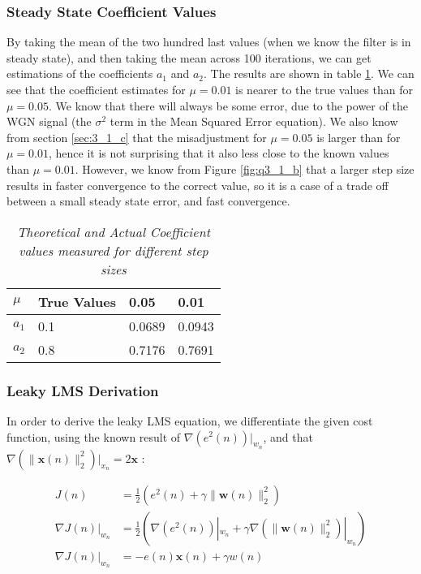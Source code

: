 \documentclass[./main.tex]{subfiles}
\begin{document}
\subsubsection{Steady State Coefficient Values}
By taking the mean of the two hundred last values (when we know the filter is in steady state), and then taking the mean across 100 iterations, we can get estimations of the coefficients $a_1$ and $a_2$. The results are shown in table \ref{tab:3_1_d}. We can see that the coefficient estimates for $\mu = 0.01$ is nearer to the true values than for $\mu = 0.05$. We know that there will always be some error, due to the power of the WGN signal (the $ \sigma^2$ term in the Mean Squared Error equation). We also know from section \ref{sec:3_1_c} that the misadjustment for  $\mu = 0.05$ is larger than for $\mu = 0.01 $, hence it is not surprising that it also less close to the known values than  $\mu = 0.01$. However, we know from Figure \ref{fig:q3_1_b} that a larger step size results in faster convergence to the correct value, so it is a case of a trade off between a small steady state error, and fast convergence.

\begin{table}[h]
\centering
\begin{tabular}{|l|l|l|l|}
\hline
$\mu$ & True Values & 0.05   & 0.01   \\ \hline
$a_1$ & 0.1               & 0.0689 & 0.0943 \\ \hline
$a_2$ & 0.8               & 0.7176 & 0.7691 \\ \hline
\end{tabular}
\caption{\textit{Theoretical and Actual Coefficient values measured for different step sizes}}
\label{tab:3_1_d}
\end{table}

\subsubsection{Leaky LMS Derivation}
In order to derive the leaky LMS equation, we differentiate the given cost function, using the known result of $ \nabla ( e^2(n) ) |_{w_n}$, and that $ \nabla (\lVert \mathbf{x}(n)\rVert_2^2 )|_{x_n} = 2\mathbf{x} $ \cite{Berger2007}  :

\begin{subequations}
\begin{align}
J(n) &= \frac{1}{2} ( e^2(n) + \gamma \lVert \mathbf{w}(n) \rVert_2^2 ) \\
\nabla J(n)|_{w_n} &= \frac{1}{2}  ( \nabla ( e^2(n) ) |_{w_n} + \gamma \nabla (\lVert \mathbf{w}(n)\rVert_2^2 )|_{w_n} ) \\
\nabla J(n)|_{w_n} &= -e(n) \mathbf{x}(n) + \gamma w(n)
\end{align}
\end{subequations}
\end{document}
